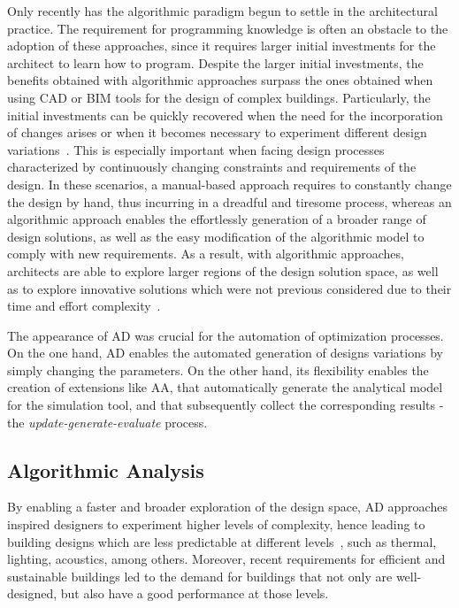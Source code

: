Only recently has the algorithmic paradigm begun to settle in the architectural practice. The requirement for programming knowledge is often an obstacle to the adoption of these approaches, since it requires larger initial investments for the architect to learn how to program. Despite the larger initial investments, the benefits obtained with algorithmic approaches surpass the ones obtained when using \ac{CAD} or \ac{BIM} tools for the design of complex buildings. Particularly, the initial investments can be quickly recovered when the need for the incorporation of changes arises or when it becomes necessary to experiment different design variations~\cite{Leitao2014GD}. This is especially important when facing design processes characterized by continuously changing constraints and requirements of the design. In these scenarios, a manual-based approach requires to constantly change the design by hand, thus incurring in a dreadful and tiresome process, whereas an algorithmic approach enables the effortlessly generation of a broader range of design solutions, as well as the easy modification of the algorithmic model to comply with new requirements. As a result, with algorithmic approaches, architects are able to explore larger regions of the design solution space, as well as to explore innovative solutions which were not previous considered due to their time and effort complexity~\cite{Leitao2014GD}. 

The appearance of \ac{AD} was crucial for the automation of optimization processes. On the one hand, \ac{AD} enables the automated generation of designs variations by simply changing the parameters. On the other hand, its flexibility enables the creation of extensions like \ac{AA}, that automatically generate the analytical model for the simulation tool, and that subsequently collect the corresponding results - the \textit{update-generate-evaluate} process.

\subsection{Algorithmic Analysis}

By enabling a faster and broader exploration of the design space, \ac{AD} approaches inspired designers to experiment higher levels of complexity, hence leading to building designs which are less predictable at different levels~\cite{Branco2017AD}, such as thermal, lighting, acoustics, among others. Moreover, recent requirements for efficient and sustainable buildings led to the demand for buildings that not only are well-designed, but also have a good performance at those levels.
	
